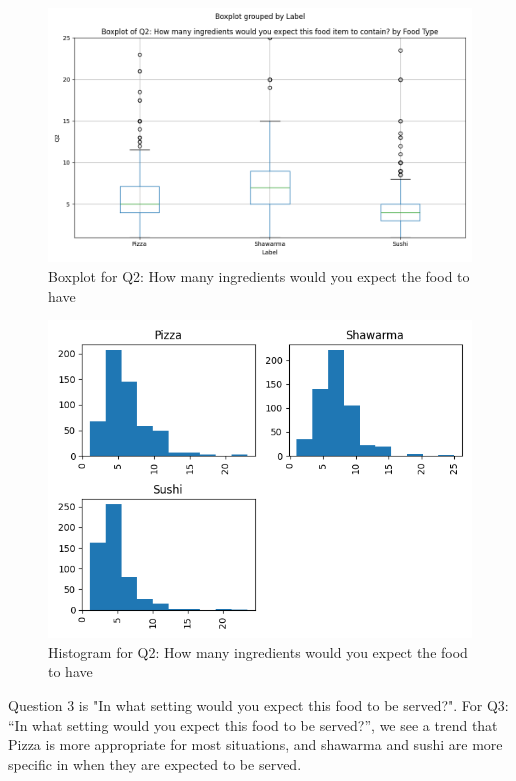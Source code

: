 \begin{figure}[h]
    \centerline{\includegraphics[width=\columnwidth]{data/boxplot_Q2.png}}
    \caption{Boxplot for Q2: How many ingredients would you expect the food to have}
    \label{f:box_q2}
\end{figure}

\begin{figure}[h]
    \centerline{\includegraphics[width=\columnwidth]{data/histogram_Q2.png}}
    \caption{Histogram for Q2: How many ingredients would you expect the food to have}
    \label{f:hist_q2}
\end{figure}

Question 3 is "In what setting would you expect this food to be served?". 
For Q3: “In what setting would you expect this food to be served?”, we see a trend that Pizza is more appropriate for most situations, and shawarma and sushi are more specific in when they are expected to be served.


